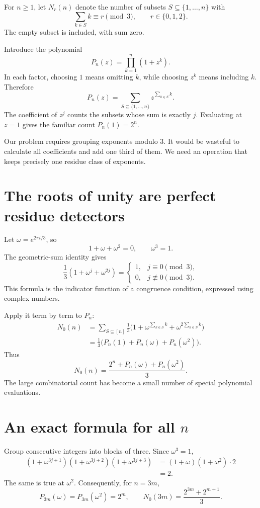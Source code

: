 For \(n\ge1\), let \(N_r(n)\) denote the number of subsets \(S\subseteq\{1,\ldots,n\}\) with
\[
 \sum_{k\in S}k\equiv r\pmod3,\qquad r\in\{0,1,2\}.
\]
The empty subset is included, with sum zero.

Introduce the polynomial
\[
 P_n(z)=\prod_{k=1}^n(1+z^k).
\]
In each factor, choosing \(1\) means omitting \(k\), while choosing \(z^k\) means including \(k\). Therefore
\[
 P_n(z)=\sum_{S\subseteq\{1,\ldots,n\}}z^{\sum_{k\in S}k}.
\]
The coefficient of \(z^j\) counts the subsets whose sum is exactly \(j\). Evaluating at \(z=1\) gives the familiar count \(P_n(1)=2^n\).

Our problem requires grouping exponents modulo \(3\). It would be wasteful to calculate all coefficients and add one third of them. We need an operation that keeps precisely one residue class of exponents.

\section{The roots of unity are perfect residue detectors}

Let \(\omega=e^{2\pi i/3}\), so
\[
 1+\omega+\omega^2=0,\qquad \omega^3=1.
\]
The geometric-sum identity gives
\[
 \frac13(1+\omega^j+\omega^{2j})=
 \begin{cases}
 1,&j\equiv0\pmod3,\\
 0,&j\not\equiv0\pmod3.
 \end{cases}
\]
This formula is the indicator function of a congruence condition, expressed using complex numbers.

Apply it term by term to \(P_n\):
\[
\begin{aligned}
 N_0(n)
 &=\sum_{S\subseteq[n]}\frac13
   \bigl(1+\omega^{\sum_{k\in S}k}
           +\omega^{2\sum_{k\in S}k}\bigr)\\
 &=\frac13\bigl(P_n(1)+P_n(\omega)+P_n(\omega^2)\bigr).
\end{aligned}
\]
Thus
\[
 \boxed{N_0(n)=\frac{2^n+P_n(\omega)+P_n(\omega^2)}3.}
\]
The large combinatorial count has become a small number of special polynomial evaluations.

\section[Exact counting formula]{An exact formula for all \(n\)}

Group consecutive integers into blocks of three. Since \(\omega^3=1\),
\[
\begin{aligned}
 (1+\omega^{3j+1})(1+\omega^{3j+2})(1+\omega^{3j+3})
 &=(1+\omega)(1+\omega^2)\cdot2\\
 &=2.
\end{aligned}
\]
The same is true at \(\omega^2\). Consequently, for \(n=3m\),
\[
 P_{3m}(\omega)=P_{3m}(\omega^2)=2^m,
 \qquad
 \boxed{N_0(3m)=\frac{2^{3m}+2^{m+1}}3.}
\]

